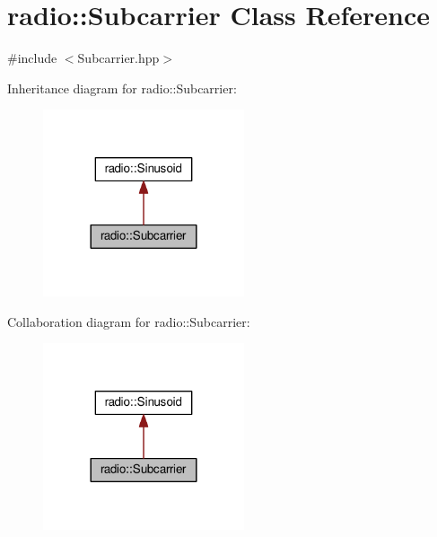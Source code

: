 \hypertarget{classradio_1_1Subcarrier}{\section{radio\+:\+:Subcarrier Class Reference}
\label{classradio_1_1Subcarrier}
}


{\ttfamily \#include $<$Subcarrier.\+hpp$>$}



Inheritance diagram for radio\+:\+:Subcarrier\+:
\nopagebreak
\begin{figure}[H]
\begin{center}
\leavevmode
\includegraphics[width=168pt]{classradio_1_1Subcarrier__inherit__graph}
\end{center}
\end{figure}


Collaboration diagram for radio\+:\+:Subcarrier\+:
\nopagebreak
\begin{figure}[H]
\begin{center}
\leavevmode
\includegraphics[width=168pt]{classradio_1_1Subcarrier__coll__graph}
\end{center}
\end{figure}
